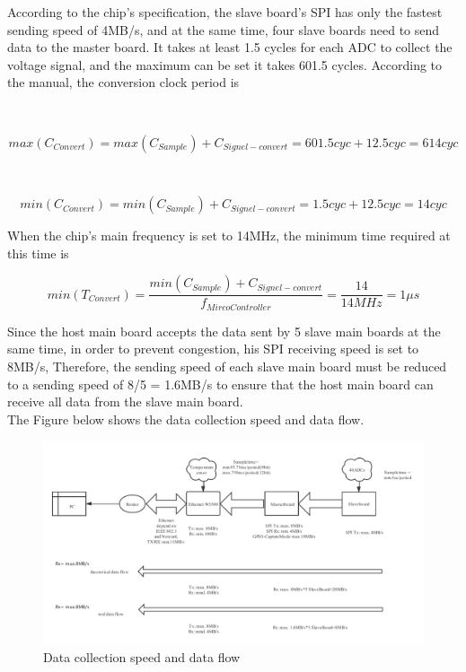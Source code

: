 According to the chip's specification, the slave board's SPI has only the fastest sending speed of 4MB/s, and at the same time, four slave boards need to send data to the master board. It takes at least 1.5 cycles for each ADC to collect the voltage signal, and the maximum can be set it takes 601.5 cycles. According to the manual, the conversion clock period is 
 
\\
\begin{center} 
\begin{equation}
max(C_{Convert}) =max(C_{Sample})+C_{Signel-convert} =601.5cyc+12.5cyc=614cyc
\end{equation}
\end{center}
\\
\begin{center} 
\begin{equation}
min(C_{Convert})=min(C_{Sample})+C_{Signel-convert} =1.5cyc+12.5cyc=14cyc
\end{equation}
\end{center}

When the chip's main frequency is set to 14MHz, the minimum time required at this time is
\\
\begin{center} 
\begin{equation}
min(T_{Convert})=  \frac{min(C_{Sample})+C_{Signel-convert}}{f_{MircoController}} = \frac{14}{14MHz} = 1\mu s
\end{equation}
\end{center}
 
Since the host main board accepts the data sent by 5 slave main boards at the same time, in order to prevent congestion, his SPI receiving speed is set to 8MB/s,
Therefore, the sending speed of each slave main board must be reduced to a sending speed of 8/5 = 1.6MB/s to ensure that the host main board can receive all data from the slave main board.
\\
The Figure below shows the data collection speed and data flow.
\begin{figure}[!ht]
	\centering
	\includegraphics[width=16cm]{grafiken/5.6.pdf}
	\caption{Data collection speed and data flow} 
	\label{fig:5.6}
\end{figure}
\FloatBarrier

